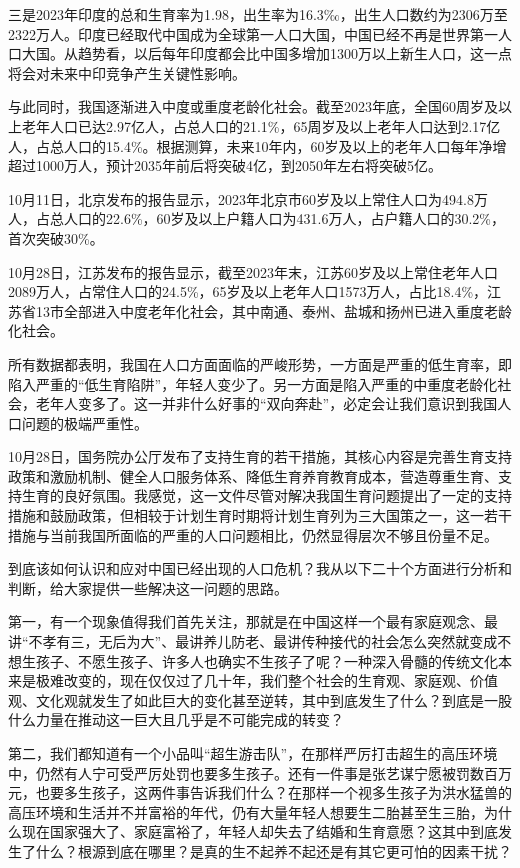 \documentclass[UTF8,11pt,oneside]{ctexart}
\begin{document}
三是2023年印度的总和生育率为1.98，出生率为16.3‰，出生人口数约为2306万至2322万人。印度已经取代中国成为全球第一人口大国，中国已经不再是世界第一人口大国。从趋势看，以后每年印度都会比中国多增加1300万以上新生人口，这一点将会对未来中印竞争产生关键性影响。

与此同时，我国逐渐进入中度或重度老龄化社会。截至2023年底，全国60周岁及以上老年人口已达2.97亿人，占总人口的21.1\%，65周岁及以上老年人口达到2.17亿人，占总人口的15.4\%。根据测算，未来10年内，60岁及以上的老年人口每年净增超过1000万人，预计2035年前后将突破4亿，到2050年左右将突破5亿。

10月11日，北京发布的报告显示，2023年北京市60岁及以上常住人口为494.8万人，占总人口的22.6\%，60岁及以上户籍人口为431.6万人，占户籍人口的30.2\%，首次突破30\%。

10月28日，江苏发布的报告显示，截至2023年末，江苏60岁及以上常住老年人口2089万人，占常住人口的24.5\%，65岁及以上老年人口1573万人，占比18.4\%，江苏省13市全部进入中度老年化社会，其中南通、泰州、盐城和扬州已进入重度老龄化社会。

所有数据都表明，我国在人口方面面临的严峻形势，一方面是严重的低生育率，即陷入严重的“低生育陷阱”，年轻人变少了。另一方面是陷入严重的中重度老龄化社会，老年人变多了。这一并非什么好事的“双向奔赴”，必定会让我们意识到我国人口问题的极端严重性。

10月28日，国务院办公厅发布了支持生育的若干措施，其核心内容是完善生育支持政策和激励机制、健全人口服务体系、降低生育养育教育成本，营造尊重生育、支持生育的良好氛围。我感觉，这一文件尽管对解决我国生育问题提出了一定的支持措施和鼓励政策，但相较于计划生育时期将计划生育列为三大国策之一，这一若干措施与当前我国所面临的严重的人口问题相比，仍然显得层次不够且份量不足。

到底该如何认识和应对中国已经出现的人口危机？我从以下二十个方面进行分析和判断，给大家提供一些解决这一问题的思路。

第一，有一个现象值得我们首先关注，那就是在中国这样一个最有家庭观念、最讲“不孝有三，无后为大”、最讲养儿防老、最讲传种接代的社会怎么突然就变成不想生孩子、不愿生孩子、许多人也确实不生孩子了呢？一种深入骨髓的传统文化本来是极难改变的，现在仅仅过了几十年，我们整个社会的生育观、家庭观、价值观、文化观就发生了如此巨大的变化甚至逆转，其中到底发生了什么？到底是一股什么力量在推动这一巨大且几乎是不可能完成的转变？

第二，我们都知道有一个小品叫“超生游击队”，在那样严厉打击超生的高压环境中，仍然有人宁可受严厉处罚也要多生孩子。还有一件事是张艺谋宁愿被罚数百万元，也要多生孩子，这两件事告诉我们什么？在那样一个视多生孩子为洪水猛兽的高压环境和生活并不并富裕的年代，仍有大量年轻人想要生二胎甚至生三胎，为什么现在国家强大了、家庭富裕了，年轻人却失去了结婚和生育意愿？这其中到底发生了什么？根源到底在哪里？是真的生不起养不起还是有其它更可怕的因素干扰？
\end{document}
